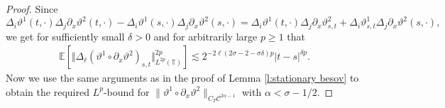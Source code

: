 \documentclass[11pt,a4paper]{article}
\theoremstyle{remark}
\newcommand{\E}{\mathbb{E}}
\newcommand{\CC}{\ensuremath{\mathscr{C}}}
\begin{document}
\begin{proof}
   Since
   \[
      \Delta_i \vartheta^1(t,\cdot) \Delta_j \partial_x \vartheta^2(t,\cdot) - \Delta_i \vartheta^1(s,\cdot) \Delta_j \partial_x \vartheta^2(s,\cdot) = \Delta_i \vartheta^1(t,\cdot) \Delta_j \partial_x \vartheta^2_{s,t} + \Delta_i \vartheta^1_{s,t} \Delta_j \partial_x \vartheta^2(s,\cdot),
   \]
   we get for sufficiently small $\delta > 0$ and for arbitrarily large $p\ge 1$ that
   \begin{align*}
      \E [\Vert  \Delta_{\ell} (\vartheta^1 \circ \partial_x \vartheta^2)_{s,t} \Vert_{L^{2 p}(\mathbb{T} )}^{2 p}] \lesssim 2^{-2\ell(2\sigma - 2 - \sigma \delta ) p} |t - s|^{\delta p}.
   \end{align*}
   Now we use the same arguments as in the proof of Lemma \ref{l:stationary besov} to obtain the required $L^p$-bound for $\| \vartheta^1\circ \partial_x \vartheta^2\|_{C_T \CC^{2\alpha-1}}$ with $\alpha < \sigma - 1 / 2$.
\end{proof}
\end{document}
